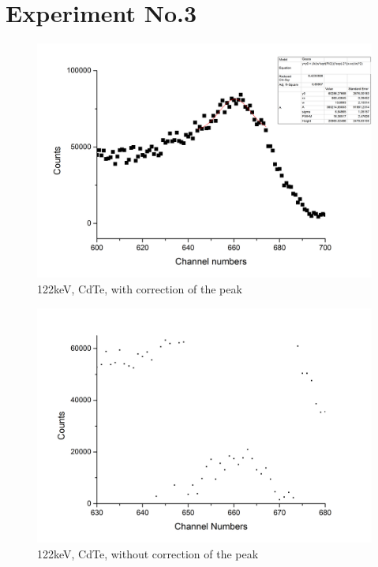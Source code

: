 \clearpage
\section*{Experiment No.3}
\begin{figure}[h]
\begin{center}
\includegraphics[scale=0.15]{Bilder/Teil3/122keV_CdTe_korrekt}
\caption{122keV, CdTe, with correction of the peak}
\label{fig:CdTeK}
\end{center}
\end{figure}
\begin{figure}[h]
\begin{center}
\includegraphics[scale=0.15]{Bilder/Teil3/122keV_CdTe_ohne}
\caption{122keV, CdTe, without correction of the peak}
\label{fig:CdTeO}
\end{center}
\end{figure}
